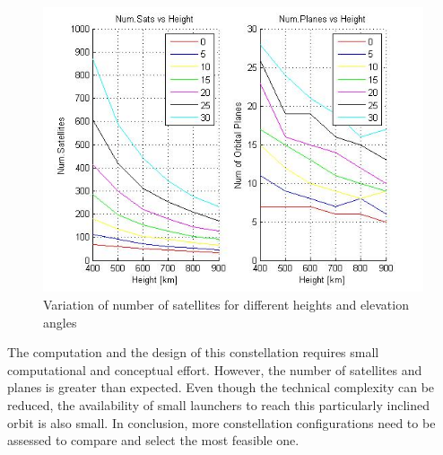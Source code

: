 \begin{figure}[H]
\begin{center}
\includegraphics[scale=0.6]{PolarOrbits/GeneralResults.jpg}
\caption{Variation of number of satellites for different heights and elevation angles}
\end{center}
\end{figure}

The computation and the design of this constellation requires small computational and conceptual effort. However, the number of satellites and planes is greater than expected. Even though the technical complexity can be reduced, the availability of small launchers to reach this particularly inclined orbit is also small. In conclusion, more constellation configurations need to be assessed to compare and select the most feasible one.
